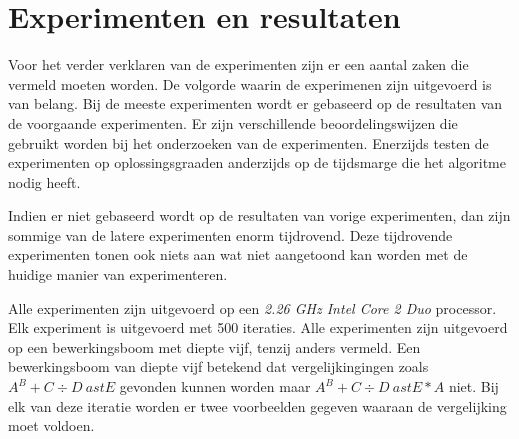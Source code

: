 \documentclass[Main.tex]{subfiles}
\begin{document}
\section{Experimenten en resultaten}
Voor het verder verklaren van de experimenten zijn er een aantal zaken die vermeld moeten worden. De volgorde waarin de experimenen zijn uitgevoerd is van belang. Bij de meeste experimenten wordt er gebaseerd op de resultaten van de voorgaande experimenten. Er zijn verschillende beoordelingswijzen die gebruikt worden bij het onderzoeken van de experimenten. Enerzijds testen de experimenten op oplossingsgraad\footnotemark[\ref{note:oplossingsgraad}] en anderzijds op de tijdsmarge die het algoritme nodig heeft. 
\par
Indien er niet gebaseerd wordt op de resultaten van vorige experimenten, dan zijn sommige van de latere experimenten enorm tijdrovend. Deze tijdrovende experimenten tonen ook niets aan wat niet aangetoond kan worden met de huidige manier van experimenteren.
\par
Alle experimenten zijn uitgevoerd op een \textit{2.26 GHz Intel Core 2 Duo} processor. Elk experiment is uitgevoerd met 500 iteraties. Alle experimenten zijn uitgevoerd op een bewerkingsboom met diepte vijf, tenzij anders vermeld. Een bewerkingsboom van diepte vijf betekend dat vergelijkingingen zoals $A^{B}+C \div D \ ast E$ gevonden kunnen worden maar $A^{B}+C \div D \ ast E \ast A$ niet. Bij elk van deze iteratie worden er twee voorbeelden gegeven waaraan de vergelijking moet voldoen.
\end{document}
